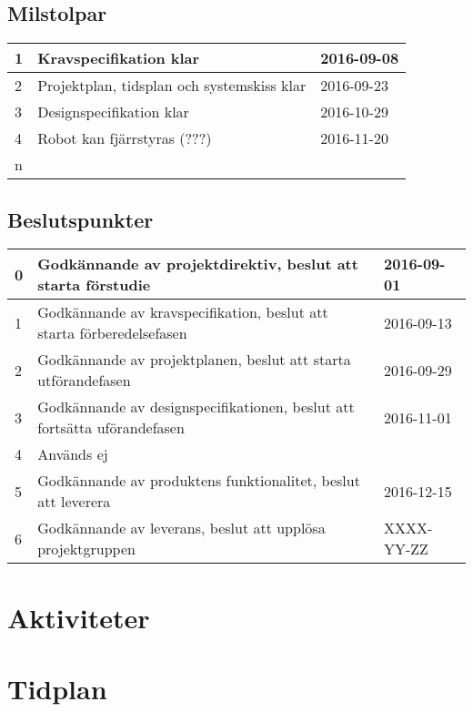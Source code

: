 \documentclass{article}
\begin{document}
\subsection{Milstolpar}
\begin{center}
  \begin{tabular}{ | l | l | l | }
    \hline
    1 & Kravspecifikation klar & 2016-09-08 \\ \hline
    2 & Projektplan, tidsplan och systemskiss klar & 2016-09-23  \\ \hline
    3 & Designspecifikation klar & 2016-10-29 \\ \hline
    4 & Robot kan fjärrstyras (???) & 2016-11-20 \\ \hline
    n &  &  \\ 
    \hline
  \end{tabular}
\end{center}
\subsection{Beslutspunkter}
\begin{center}
  \begin{tabular}{ | l | l | l | }
    \hline
    0 & Godkännande av projektdirektiv, beslut att starta förstudie & 2016-09-01 \\ \hline
    1 & Godkännande av kravspecifikation, beslut att starta förberedelsefasen & 2016-09-13 \\ \hline
    2 & Godkännande av projektplanen, beslut att starta utförandefasen & 2016-09-29 \\ \hline
    3 & Godkännande av designspecifikationen, beslut att fortsätta uförandefasen & 2016-11-01 \\ \hline
    4 & Används ej &  \\ \hline
    5 & Godkännande av produktens funktionalitet, beslut att leverera & 2016-12-15 \\ \hline
    6 & Godkännande av leverans, beslut att upplösa projektgruppen & XXXX-YY-ZZ \\
    \hline
  \end{tabular}
\end{center}

\section{Aktiviteter}
\section{Tidplan}
\end{document}

